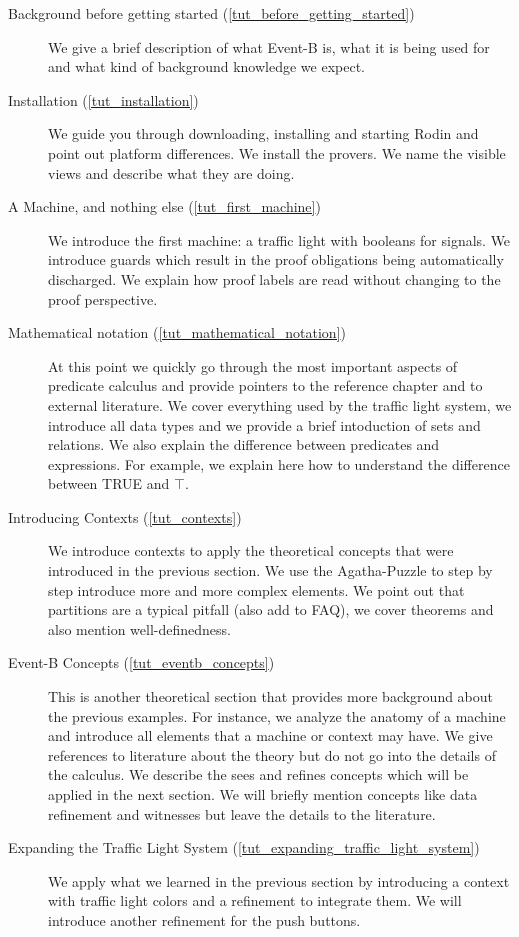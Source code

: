\begin{description}
	\item[Background before getting started (\ref{tut_before_getting_started})] We give a brief description of what Event-B is, what it is being used for and what kind of background knowledge we expect.
	\item[Installation (\ref{tut_installation})] We guide you through downloading, installing and starting Rodin and point out platform differences.  We install the provers.  We name the visible views and describe what they are doing.
	\item[A Machine, and nothing else (\ref{tut_first_machine})] We introduce the first machine: a traffic light with booleans for signals.  We introduce guards which result in the proof obligations being automatically discharged.  We explain how proof labels are read without changing to the proof perspective.
	\item[Mathematical notation (\ref{tut_mathematical_notation})] At this point we quickly go through the most important aspects of predicate calculus and provide pointers to the reference chapter and to external literature.  We cover everything used by the traffic light system, we introduce all data types and we provide a brief intoduction of sets and relations.  We also explain the difference between predicates and expressions. For example, we explain here how to understand the difference between TRUE and $\top$.  
	\item[Introducing Contexts (\ref{tut_contexts})] We introduce contexts to apply the theoretical concepts that were introduced in the previous section.  We use the Agatha-Puzzle to step by step introduce more and more complex elements.  We point out that partitions are a typical pitfall (also add to FAQ), we cover theorems and also mention well-definedness.
	\item[Event-B Concepts (\ref{tut_eventb_concepts})] This is another theoretical section that provides more background about the previous examples.  For instance, we analyze the anatomy of a machine and introduce all elements that a machine or context may have. We give references to literature about the theory but do not go into the details of the  calculus.  We describe the sees and refines concepts which will be applied in the next section.  We will briefly mention concepts like data refinement and witnesses but leave the details to the literature.
	\item[Expanding the Traffic Light System (\ref{tut_expanding_traffic_light_system})]  We apply what we learned in the previous section by introducing a context with traffic light colors and a refinement to integrate them.  We will introduce another refinement for the push buttons.


\end{description}
